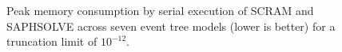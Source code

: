 \begin{figure}[h!]
  \centering
  
  \caption{Peak memory consumption by serial execution of SCRAM and SAPHSOLVE across seven event tree models (lower is better) for a truncation limit of $10^{-12}$.}
  \label{fig:memory_usage}
\end{figure}